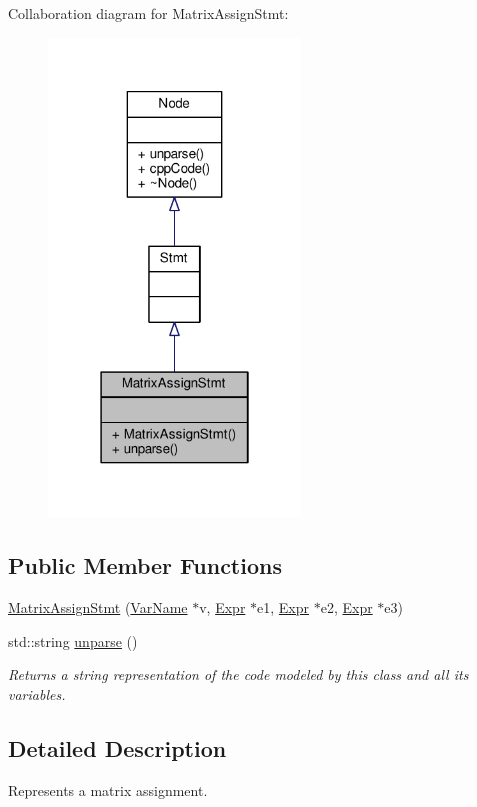 Collaboration diagram for Matrix\-Assign\-Stmt\-:\nopagebreak
\begin{figure}[H]
\begin{center}
\leavevmode
\includegraphics[width=190pt]{classMatrixAssignStmt__coll__graph}
\end{center}
\end{figure}
\subsection*{Public Member Functions}
\begin{DoxyCompactItemize}
\item 
\hyperlink{classMatrixAssignStmt_aa68d9d5e2febd0e7378fa8ce9433276e}{Matrix\-Assign\-Stmt} (\hyperlink{classVarName}{Var\-Name} $\ast$v, \hyperlink{classExpr}{Expr} $\ast$e1, \hyperlink{classExpr}{Expr} $\ast$e2, \hyperlink{classExpr}{Expr} $\ast$e3)
\item 
std\-::string \hyperlink{classMatrixAssignStmt_a7eb7f14cd0efb9a8fbe6a463a5f5a7cf}{unparse} ()
\begin{DoxyCompactList}\small\item\em Returns a string representation of the code modeled by this class and all its variables. \end{DoxyCompactList}\end{DoxyCompactItemize}


\subsection{Detailed Description}
Represents a matrix assignment. \par
 

